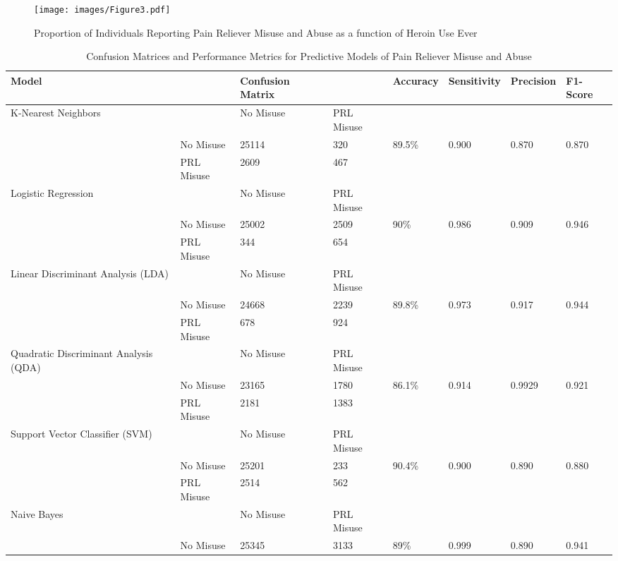 \documentclass[sigconf]{acmart}
\begin{document}
\begin{figure}[!ht]
  \centering\texttt{[image: images/Figure3.pdf]}
  \caption{Proportion of Individuals Reporting Pain Reliever Misuse and Abuse
  as a function of Heroin Use Ever}
  \label{f:Figure3}
\end{figure}
 
 
\begin{table*}[ht]
  \caption{Confusion Matrices and Performance Metrics for Predictive Models of 
  Pain Reliever Misuse and Abuse}
  \label{tab:freq}
  \begin{tabular}{llllllll}
    \toprule
    Model& & Confusion Matrix & & Accuracy & Sensitivity & Precision & F1-Score \\
    \midrule
    K-Nearest Neighbors & & No Misuse & PRL Misuse &  &  &  & \\
     & No Misuse & 25114 & 320 & 89.5\% & 0.900 & 0.870 & 0.870 \\
     & PRL Misuse & 2609 & 467 &  &  &  & \\
    \midrule
    Logistic Regression & & No Misuse & PRL Misuse &  &  &  & \\
     & No Misuse & 25002 & 2509 & 90\% & 0.986 & 0.909 & 0.946 \\
     & PRL Misuse & 344 & 654 &  &  &  & \\
    \midrule
    Linear Discriminant Analysis (LDA) & & No Misuse & PRL Misuse &  &  &  & \\
     & No Misuse & 24668 & 2239 & 89.8\% & 0.973 & 0.917 & 0.944 \\
     & PRL Misuse & 678 & 924 &  &  &  & \\
    \midrule
    Quadratic Discriminant Analysis (QDA) & & No Misuse & PRL Misuse &  &  &  & \\
     & No Misuse & 23165 & 1780 & 86.1\% & 0.914 & 0.9929 & 0.921 \\
     & PRL Misuse & 2181 & 1383 &  &  &  & \\
    \midrule
    Support Vector Classifier (SVM) & & No Misuse & PRL Misuse &  &  &  & \\
     & No Misuse & 25201 & 233 & 90.4\% & 0.900 & 0.890 & 0.880 \\
     & PRL Misuse & 2514 & 562 &  &  &  & \\
    \midrule
    Naive Bayes & & No Misuse & PRL Misuse &  &  &  & \\
     & No Misuse & 25345 & 3133 & 89\% & 0.999 & 0.890 & 0.941 \\

\end{tabular}
\end{table*}
\end{document}

